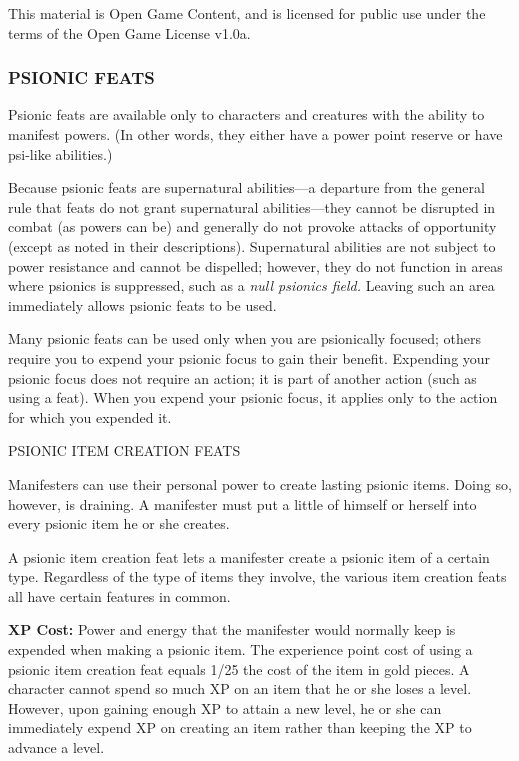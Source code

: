 \documentclass{article}
\begin{document}
This material is Open Game Content, and is licensed for public use under the terms 
of the Open Game License v1.0a.

\subsubsection*{{\LARGE{}PSIONIC FEATS}}

\vspace{12pt}
Psionic feats are available only to characters and creatures with the ability to 
manifest powers. (In other words, they either have a power point reserve or have 
psi-like abilities.)

Because psionic feats are supernatural abilities---a departure from the general 
rule that feats do not grant supernatural abilities---they cannot be disrupted 
in combat (as powers can be) and generally do not provoke attacks of opportunity 
(except as noted in their descriptions). Supernatural abilities are not subject 
to power resistance and cannot be dispelled; however, they do not function in areas 
where psionics is suppressed, such as a \textit{null psionics field. }Leaving such 
an area immediately allows psionic feats to be used.

Many psionic feats can be used only when you are psionically focused; others require 
you to expend your psionic focus to gain their benefit. Expending your psionic 
focus does not require an action; it is part of another action (such as using a 
feat). When you expend your psionic focus, it applies only to the action for which 
you expended it.

\vspace{12pt}
PSIONIC ITEM CREATION FEATS

Manifesters can use their personal power to create lasting psionic items. Doing 
so, however, is draining. A manifester must put a little of himself or herself 
into every psionic item he or she creates.

A psionic item creation feat lets a manifester create a psionic item of a certain 
type. Regardless of the type of items they involve, the various item creation feats 
all have certain features in common.

\textbf{XP Cost:} Power and energy that the manifester would normally keep is expended 
when making a psionic item. The experience point cost of using a psionic item creation 
feat equals 1/25 the cost of the item in gold pieces. A character cannot spend 
so much XP on an item that he or she loses a level. However, upon gaining enough 
XP to attain a new level, he or she can immediately expend XP on creating an item 
rather than keeping the XP to advance a level.
\end{document}
